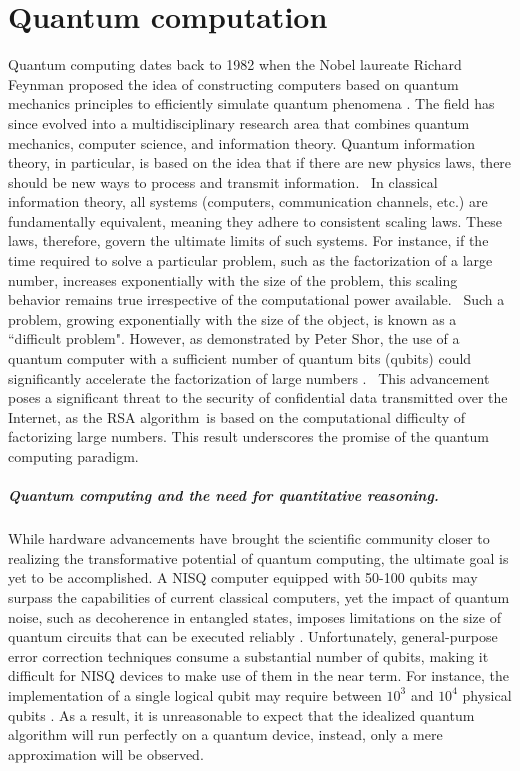 \chapter{Quantum computation}\label{ch:qc}

Quantum computing dates back to 1982 when the Nobel laureate Richard Feynman proposed the idea of constructing computers based on quantum mechanics principles to efficiently simulate quantum phenomena \cite{feynman2018simulating}. 
The field has since evolved into a multidisciplinary research area that combines quantum mechanics, computer science, and information theory. Quantum information theory, in particular, is based on the idea that if there are new physics laws, there should be new ways to process and transmit information.  In classical information theory, all systems (computers, communication channels, etc.) are fundamentally equivalent, meaning they adhere to consistent scaling laws. These laws, therefore, govern the ultimate limits of such systems. For instance, if the time required to solve a particular problem, such as the factorization of a large number, increases exponentially with the size of the problem, this scaling behavior remains true irrespective of the computational power available.  Such a problem, growing exponentially with the size of the object, is known as a ``difficult problem". However, as demonstrated by Peter Shor, the use of a quantum computer with a sufficient number of quantum bits (qubits) could significantly accelerate the factorization of large numbers \cite{shor1994algorithms}.  This advancement poses a significant threat to the security of confidential data transmitted over the Internet, as the RSA algorithm is based on the computational difficulty of factorizing large numbers. This result underscores the promise of the quantum computing paradigm.


\paragraph{Quantum computing and the need for quantitative reasoning.}
While hardware advancements have brought the scientific community closer to realizing the transformative potential of quantum computing, the ultimate goal is yet to be accomplished. A NISQ computer equipped with 50-100 qubits may surpass the capabilities of current classical computers, yet the impact of quantum noise, such as decoherence in entangled states, imposes limitations on the size of quantum circuits that can be executed reliably \cite{preskill2018quantum}. Unfortunately, general-purpose error correction techniques \cite{calderbank1996good, gottesman1997stabilizer, steane1996error} consume a substantial number of qubits, making it difficult for NISQ devices to make use of them in the near term. For instance, the implementation of a single logical qubit may require between $10^3$ and $10^4$ physical qubits \cite{fowler2012surface}. As a result, it is unreasonable to expect that the idealized quantum algorithm will run perfectly on a quantum device, instead, only a mere approximation will be observed.

